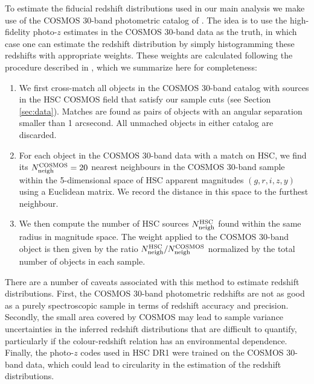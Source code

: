 \documentclass[a4paper,11pt]{article}
\begin{document}
    To estimate the fiducial redshift distributions used in our main analysis we make use of the COSMOS 30-band photometric catalog of \cite{2016ApJS..224...24L}. The idea is to use the high-fidelity photo-$z$ estimates in the COSMOS 30-band data as the truth, in which case one can estimate the redshift distribution by simply histogramming these redshifts with appropriate weights. These weights are calculated following the procedure described in \cite{2017MNRAS.465.1454H,2019PASJ...71...43H}, which we summarize here for completeness:
    \begin{enumerate}
      \item We first cross-match all objects in the COSMOS 30-band catalog with sources in the HSC COSMOS field that satisfy our sample cuts (see Section \ref{sec:data}). Matches are found as pairs of objects with an angular separation smaller than 1 arcsecond. All unmached objects in either catalog are discarded.
      \item For each object in the COSMOS 30-band data with a match on HSC, we find its $N_{\rm neigh}^{\rm COSMOS}=20$ nearest neighbours in the COSMOS 30-band sample within the 5-dimensional space of HSC apparent magnitudes $(g,r,i,z,y)$ using a Euclidean matrix. We record the distance in this space to the furthest neighbour.
      \item We then compute the number of HSC sources $N_{\rm neigh}^{\rm HSC}$ found within the same radius in magnitude space. The weight applied to the COSMOS 30-band object is then given by the ratio $N^{\rm HSC}_{\rm neigh}/N^{\rm COSMOS}_{\rm neigh}$ normalized by the total number of objects in each sample.
    \end{enumerate}
    There are a number of caveats associated with this method to estimate redshift distributions. First, the COSMOS 30-band photometric redshifts are not as good as a purely spectroscopic sample in terms of redshift accuracy and precision. Secondly, the small area covered by COSMOS may lead to sample variance uncertainties in the inferred redshift distributions that are difficult to quantify, particularly if the colour-redshift relation has an environmental dependence. Finally, the photo-$z$ codes used in HSC DR1 were trained on the COSMOS 30-band data, which could lead to circularity in the estimation of the redshift distributions.
    
\end{document}
